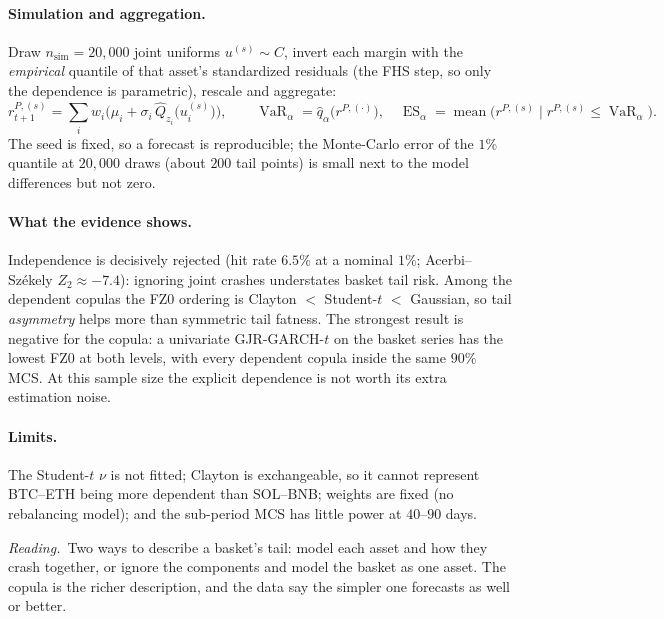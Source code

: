 \documentclass[11pt,a4paper]{article}
\newcommand{\VaR}{\operatorname{VaR}}
\newcommand{\ES}{\operatorname{ES}}
\newcommand{\intuition}[1]{\par\smallskip\noindent\textit{Reading.}\ #1\par\smallskip}
\begin{document}
\paragraph{Simulation and aggregation.} Draw $n_{\text{sim}}=20{,}000$ joint
uniforms $u^{(s)}\sim C$, invert each margin with the \emph{empirical} quantile
of that asset's standardized residuals (the FHS step, so only the dependence is
parametric), rescale and aggregate:
\begin{equation}
  r^{P,(s)}_{t+1}=\sum_i w_i\Big(\mu_i+\sigma_i\,\hat Q_{z_i}\big(u^{(s)}_i\big)\Big),
  \qquad
  \VaR_\alpha=\hat q_\alpha\big(r^{P,(\cdot)}\big),\quad
  \ES_\alpha=\operatorname{mean}\big(r^{P,(s)}\mid r^{P,(s)}\le\VaR_\alpha\big).
\end{equation}
The seed is fixed, so a forecast is reproducible; the Monte-Carlo error of the
$1\%$ quantile at $20{,}000$ draws (about $200$ tail points) is small next to the
model differences but not zero.

\paragraph{What the evidence shows.} Independence is decisively rejected (hit
rate $6.5\%$ at a nominal $1\%$; Acerbi--Sz\'ekely $Z_2\approx-7.4$): ignoring
joint crashes understates basket tail risk. Among the dependent copulas the FZ0
ordering is Clayton $<$ Student-$t$ $<$ Gaussian, so tail \emph{asymmetry}
helps more than symmetric tail fatness. The strongest result is negative for the
copula: a univariate GJR-GARCH-$t$ on the basket series has the lowest FZ0 at
both levels, with every dependent copula inside the same $90\%$ MCS. At this
sample size the explicit dependence is not worth its extra estimation noise.

\paragraph{Limits.} The Student-$t$ $\nu$ is not fitted; Clayton is
exchangeable, so it cannot represent BTC--ETH being more dependent than
SOL--BNB; weights are fixed (no rebalancing model); and the sub-period MCS has
little power at $40$--$90$ days.

\intuition{Two ways to describe a basket's tail: model each asset and how they
crash together, or ignore the components and model the basket as one asset. The
copula is the richer description, and the data say the simpler one forecasts as
well or better.}

\end{document}
